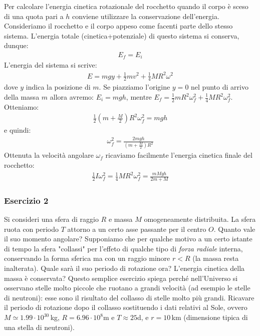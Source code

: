 \documentclass[12pt,a4paper]{book}
\begin{document}
Per calcolare l'energia cinetica rotazionale del rocchetto quando il corpo è sceso di una quota pari a $h$ conviene utilizzare la conservazione dell'energia.
Consideriamo il rocchetto e il corpo appeso come facenti parte dello stesso sistema.  L'energia totale (cinetica+potenziale) di questo sistema si conserva, dunque:
\begin{gather*}
E_f =E_i
\end{gather*}
L'energia del sistema si scrive:
\begin{gather*}
E=mgy+\frac{1}{2}mv^2 + \frac{1}{4}MR^2 \omega^2
\end{gather*}
dove $y$ indica la posizione di $m$. Se piazziamo l'origine $y=0$ nel punto di arrivo della massa $m$ allora avremo:
$E_i=mgh$, mentre $E_f=\frac{1}{2}m R^2 \omega_f^2 + \frac{1}{4}MR^2 \omega_f^2$. Otteniamo:
\begin{gather*}
\frac{1}{2}(m+\frac{M}{2}) R^2 \omega_f^2=mgh
\end{gather*}
e quindi:
\begin{gather*}
 \omega_f^2= \frac{2mgh}{(m+\frac{M}{2}) R^2}
\end{gather*}
Ottenuta la velocità angolare $\omega_f$ ricaviamo facilmente l'energia cinetica finale del rocchetto:
\begin{gather*}
 \frac{1}{2} I \omega_f^2=  \frac{1}{4} M R^2 \omega_f^2= \frac{mMgh}{2m+M}
\end{gather*}


\subsubsection*{Esercizio 2}
Si consideri una sfera di raggio $R$ e massa $M$ omogeneamente distribuita.
La sfera ruota con periodo $T$ attorno a un certo asse passante per il centro $O$. 
Quanto vale il suo momento angolare? Supponiamo che per qualche motivo a un certo 
istante di tempo la sfera "collassi" per l'effeto di qualche tipo di \textit{forza radiale} interna, 
conservando la forma sferica ma con un raggio minore $r<R$ (la massa resta inalterata). Quale sarà il suo periodo di rotazione ora? L'energia cinetica della massa è conservata? Questo semplice esercizio spiega perché nell'Universo si osservano stelle molto piccole che ruotano
a grandi velocità (ad esempio le stelle di neutroni): esse sono il risultato del collasso di stelle molto più grandi. Ricavare il periodo di rotazione dopo il collasso sostituendo i dati relativi al Sole, ovvero $M\simeq 1.99\cdot10^{30}\,$kg, $R=6.96\cdot 10^8$m e $T\approx 25$d, e $r=10\,$km (dimensione tipica di una stella di neutroni).
\end{document}
